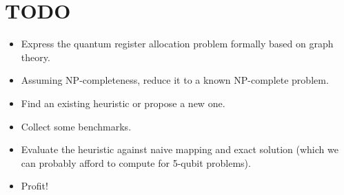 \documentclass[11pt,a4paper]{article}
\begin{document}
\section{TODO}

\begin{itemize}
\item Express the quantum register allocation problem formally based on graph theory.
\item Assuming NP-completeness, reduce it to a known NP-complete problem.
\item Find an existing heuristic or propose a new one.
\item Collect some benchmarks.
\item Evaluate the heuristic against naive mapping and exact solution (which we can probably afford to compute for 5-qubit problems).
\item Profit!
\end{itemize}





\end{document}
